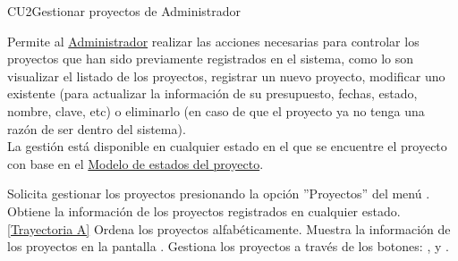	\begin{UseCase}{CU2}{Gestionar proyectos de Administrador}{
			
			Permite al \hyperlink{admin}{Administrador} realizar las acciones necesarias para controlar los proyectos que han sido previamente registrados en el sistema, como lo son visualizar el listado de los proyectos, registrar un nuevo proyecto, modificar uno existente (para actualizar la información de su presupuesto, fechas, estado, nombre, clave, etc) o eliminarlo (en caso de que el proyecto ya no tenga una razón de ser dentro del sistema).\\
			La gestión está disponible en cualquier estado en el que se encuentre el proyecto con base en el \hyperlink{edoProy}{Modelo de estados del proyecto}.
				
	}
	\end{UseCase}
	\begin{UCtrayectoria}
		\UCpaso[\UCactor] Solicita gestionar los proyectos presionando la opción ''Proyectos'' del menú .
		\UCpaso[\UCsist] Obtiene la información de los proyectos registrados en cualquier estado. \hyperlink{CU2:TAA}{[Trayectoria A]}
		\UCpaso[\UCsist] Ordena los proyectos alfabéticamente.
		\UCpaso[\UCsist] Muestra la información de los proyectos en la pantalla . \label{GP-P3}
		\UCpaso[\UCactor] Gestiona los proyectos a través de los botones: , \editar  y \eliminar. 
	\end{UCtrayectoria}		
